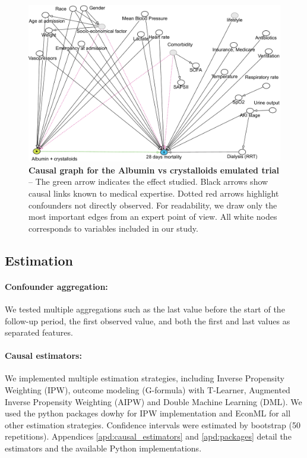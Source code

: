 \documentclass[french,12pt,twoside,a4paper]{book}
\begin{document}
\begin{figure}[t!]
  \centering%
  \includegraphics[width=.9\linewidth]{img/chapter_4/dagitty_graph.pdf}
  \caption{\textbf{Causal graph for the Albumin vs crystalloids emulated
      trial} -- The
    green arrow indicates the effect studied. Black arrows show causal links
    known to medical expertise. Dotted red arrows highlight confounders not directly
    observed. For readability, we draw only the most important edges from an
    expert point of view. All white nodes corresponds to variables included in
    our study.}\label{fig:causal_diagram_albumin}
\end{figure}


\subsection{Estimation}\label{subsec:causal_tuto:estimation_mimic}

\paragraph{Confounder aggregation:}

We tested multiple aggregations such as the last value before the start of the
follow-up period, the first observed value, and both the first and last values as
separated features.

\paragraph{Causal estimators:}

We implemented multiple estimation strategies, including Inverse Propensity
Weighting (IPW), outcome modeling (G-formula) with T-Learner, Augmented Inverse
Propensity Weighting (AIPW) and Double Machine Learning (DML). We used the
python packages dowhy \citep{sharma2018tutorial} for IPW implementation and
EconML \citep{battocchi2019econml} for all other estimation strategies.
Confidence intervals were estimated by bootstrap (50 repetitions).
Appendices \ref{apd:causal_estimators} and
\ref{apd:packages} detail the estimators and the available Python
implementations.
\end{document}
